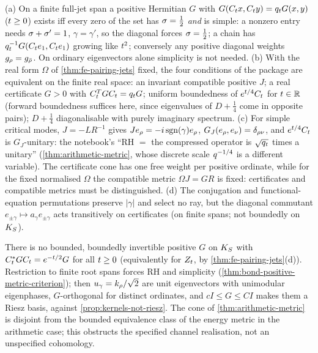 \begin{theorem}
\label{thm:bond-positive-metric-criterion}
(a) On a finite full-jet span a positive Hermitian $G$ with $G(C_t x,C_t y) = q_t G(x,y)$ ($t\ge0$) exists iff every
zero of the set has $\sigma = \tfrac12$ \emph{and} is simple: a nonzero entry needs $\sigma+\sigma' = 1$, $\gamma = \gamma'$, so the
diagonal forces $\sigma = \tfrac12$; a chain has $q_t^{-1}G(C_t e_1,C_t e_1)$ growing like $t^2$; conversely any positive
diagonal weights $g_\rho = g_{\bar{\rho}}$. On ordinary eigenvectors alone simplicity is not needed. (b) With the real form
$\Omega$ of \cref{thm:fe-pairing-jets} fixed, the four conditions of the package are equivalent on the finite real space: %
an invariant compatible positive $J$; a real certificate $G>0$ with $C_t^{T}GC_t = q_t G$; uniform boundedness of
$e^{t/4}C_t$ for $t\in\mathbb R$ (forward boundedness suffices here, since eigenvalues of $D+\tfrac14$ come in opposite
pairs); $D+\tfrac14$ diagonalisable with purely imaginary spectrum. (c) For simple critical modes, $J = -LR^{-1}$ gives
$Je_\rho = -i\,\mathrm{sgn}(\gamma)e_\rho$, $G_J(e_\rho,e_\nu) = \delta_{\rho\nu}$, and $e^{t/4}C_t$ is $G_J$-unitary:
the notebook's ``RH $=$ the compressed operator is $\sqrt{q_t}$ times a unitary'' (\cref{thm:arithmetic-metric}, whose
discrete scale $q^{-1/4}$ is a different variable). The certificate cone has one free weight per positive ordinate, while
for the fixed normalised $\Omega$ the compatible metric $\Omega J = GR$ is fixed: certificates and compatible metrics must be %
distinguished. (d) The conjugation and functional-equation permutations preserve $|\gamma|$ and select no ray, but the
diagonal commutant $e_{\pm\gamma}\mapsto a_{\gamma}e_{\pm\gamma}$ acts transitively on certificates (on finite spans; not
boundedly on $K_S$).
\end{theorem}

\begin{theorem}
\label{thm:no-energy-equivalent-metric}
There is no bounded, boundedly invertible positive $G$ on $K_S$ with $C_t^{*}GC_t = e^{-t/2}G$ for all $t\ge0$
(equivalently for $Z_t$, by \cref{thm:fe-pairing-jets}(d)). Restriction to finite root spans forces RH and simplicity
(\cref{thm:bond-positive-metric-criterion}); then $u_\gamma = k_\rho/\sqrt2$ are unit eigenvectors with unimodular
eigenphases, $G$-orthogonal for distinct ordinates, and $cI\le G\le CI$ makes them a Riesz basis, against
\cref{prop:kernels-not-riesz}. The cone of \cref{thm:arithmetic-metric} is disjoint from the bounded equivalence class of the
energy metric in the arithmetic case; this obstructs the specified channel realisation, not an unspecified cohomology.
\end{theorem}

